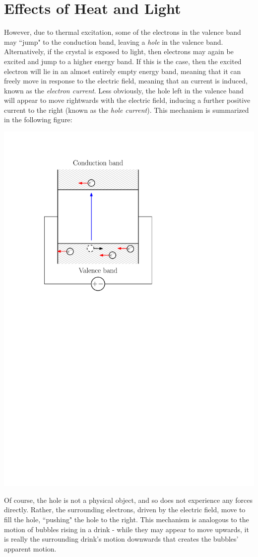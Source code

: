 \documentclass[letterpaper]{article}
\theoremstyle{remark}
\begin{document}
\section{Effects of Heat and Light}
However, due to thermal excitation, some of the electrons in the valence band may ``jump" to the conduction band, leaving a \emph{hole} in the valence band. Alternatively, if the crystal is exposed to light, then electrons may again be excited and jump to a higher energy band. If this is the case, then the excited electron will lie in an almost entirely empty energy band, meaning that it can freely move in response to the electric field, meaning that an current is induced, known as the \emph{electron current}. Less obviously, the hole left in the valence band will appear to move rightwards with the electric field, inducing a further positive current to the right (known as the \emph{hole current}). This mechanism is summarized in the following figure:
\begin{center}
    \includegraphics[scale=0.7]{si_excited_electrons.pdf}
\end{center}
Of course, the hole is not a physical object, and so does not experience any forces directly. Rather, the surrounding electrons, driven by the electric field, move to fill the hole, ``pushing" the hole to the right. This mechanism is analogous to the motion of bubbles rising in a drink - while they may appear to move upwards, it is really the surrounding drink's motion downwards that creates the bubbles' apparent motion.
\end{document}

